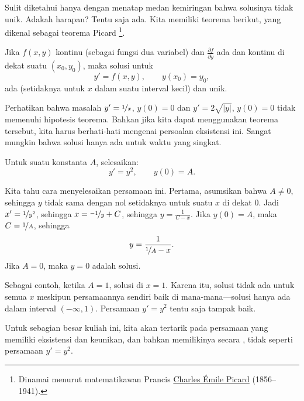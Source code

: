 Sulit diketahui hanya dengan menatap medan kemiringan bahwa
solusinya tidak
unik.
Adakah harapan?
Tentu saja ada.  Kita memiliki teorema berikut,
yang dikenal sebagai teorema Picard%
\footnote{Dinamai menurut matematikawan Prancis
\href{https://en.wikipedia.org/wiki/Charles_\%C3\%89mile_Picard}{Charles \'Emile Picard}
(1856--1941).}.

\begin{theorem}%
\label{slope:picardthm}%
Jika $f(x,y)$ kontinu (sebagai fungsi dua
variabel) dan $\frac{\partial f}{\partial y}$ ada dan
kontinu di dekat suatu $(x_0,y_0)$, maka solusi untuk
\begin{equation*}
y' = f(x,y), \qquad y(x_0) = y_0,
\end{equation*}
ada (setidaknya untuk $x$ dalam suatu interval kecil) dan unik.
\end{theorem}

Perhatikan bahwa masalah $y' = \nicefrac{1}{x}$, $y(0) = 0$ dan
$y' = 2 \sqrt{\lvert y \rvert}$, $y(0) = 0$ tidak memenuhi hipotesis
teorema.
Bahkan jika kita dapat menggunakan teorema tersebut,
kita harus berhati-hati mengenai persoalan eksistensi ini.  Sangat
mungkin bahwa solusi hanya ada untuk waktu yang singkat.

\begin{example}
Untuk suatu konstanta $A$, selesaikan:
\begin{equation*}
y' = y^2, \qquad y(0) = A .
\end{equation*}

Kita tahu cara menyelesaikan persamaan ini.  Pertama, asumsikan bahwa $A \neq 0$,
sehingga $y$ tidak sama dengan nol setidaknya untuk suatu $x$ di dekat 0.  Jadi
$x' = \nicefrac{1}{y^2}$, sehingga
$x = \nicefrac{-1}{y} + C$, sehingga $y = \frac{1}{C-x}$.  Jika $y(0) = A$, maka
$C = \nicefrac{1}{A}$, sehingga
\begin{equation*}
y = \frac{1}{\nicefrac{1}{A} - x} .
\end{equation*}
Jika $A=0$, maka $y=0$ adalah solusi.

Sebagai contoh, ketika $A=1$,
solusi  di $x=1$.  Karena itu, solusi tidak ada
untuk semua $x$ meskipun persamaannya sendiri baik di mana-mana---solusi hanya ada
dalam interval $(-\infty,1)$.  Persamaan
$y' = y^2$ tentu saja
tampak baik.
\end{example}

Untuk sebagian besar
kuliah ini, kita akan tertarik pada persamaan yang memiliki eksistensi dan
keunikan, dan bahkan memilikinya secara , tidak seperti persamaan
$y'=y^2$.

